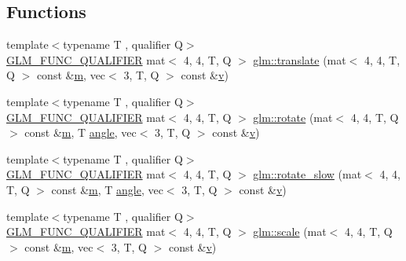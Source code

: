 \subsection*{Functions}
\begin{DoxyCompactItemize}
\item 
{\footnotesize template$<$typename T , qualifier Q$>$ }\\\mbox{\hyperlink{setup_8hpp_a33fdea6f91c5f834105f7415e2a64407}{G\+L\+M\+\_\+\+F\+U\+N\+C\+\_\+\+Q\+U\+A\+L\+I\+F\+I\+ER}} mat$<$ 4, 4, T, Q $>$ \mbox{\hyperlink{group__gtc__matrix__transform_ga1a4ecc4ad82652b8fb14dcb087879284}{glm\+::translate}} (mat$<$ 4, 4, T, Q $>$ const \&\mbox{\hyperlink{_s_d_l__opengl__glext_8h_af593500c283bf1a787a6f947f503a5c2}{m}}, vec$<$ 3, T, Q $>$ const \&\mbox{\hyperlink{_s_d_l__opengl_8h_a10a82eabcb59d2fcd74acee063775f90}{v}})
\item 
{\footnotesize template$<$typename T , qualifier Q$>$ }\\\mbox{\hyperlink{setup_8hpp_a33fdea6f91c5f834105f7415e2a64407}{G\+L\+M\+\_\+\+F\+U\+N\+C\+\_\+\+Q\+U\+A\+L\+I\+F\+I\+ER}} mat$<$ 4, 4, T, Q $>$ \mbox{\hyperlink{group__gtc__matrix__transform_gaee9e865eaa9776370996da2940873fd4}{glm\+::rotate}} (mat$<$ 4, 4, T, Q $>$ const \&\mbox{\hyperlink{_s_d_l__opengl__glext_8h_af593500c283bf1a787a6f947f503a5c2}{m}}, T \mbox{\hyperlink{_s_d_l__opengl__glext_8h_a9e06c1f76a20fed54ca742cd25cb02c4}{angle}}, vec$<$ 3, T, Q $>$ const \&\mbox{\hyperlink{_s_d_l__opengl_8h_a10a82eabcb59d2fcd74acee063775f90}{v}})
\item 
{\footnotesize template$<$typename T , qualifier Q$>$ }\\\mbox{\hyperlink{setup_8hpp_a33fdea6f91c5f834105f7415e2a64407}{G\+L\+M\+\_\+\+F\+U\+N\+C\+\_\+\+Q\+U\+A\+L\+I\+F\+I\+ER}} mat$<$ 4, 4, T, Q $>$ \mbox{\hyperlink{namespaceglm_ae6c0c49198a58536fac6ab580073b157}{glm\+::rotate\+\_\+slow}} (mat$<$ 4, 4, T, Q $>$ const \&\mbox{\hyperlink{_s_d_l__opengl__glext_8h_af593500c283bf1a787a6f947f503a5c2}{m}}, T \mbox{\hyperlink{_s_d_l__opengl__glext_8h_a9e06c1f76a20fed54ca742cd25cb02c4}{angle}}, vec$<$ 3, T, Q $>$ const \&\mbox{\hyperlink{_s_d_l__opengl_8h_a10a82eabcb59d2fcd74acee063775f90}{v}})
\item 
{\footnotesize template$<$typename T , qualifier Q$>$ }\\\mbox{\hyperlink{setup_8hpp_a33fdea6f91c5f834105f7415e2a64407}{G\+L\+M\+\_\+\+F\+U\+N\+C\+\_\+\+Q\+U\+A\+L\+I\+F\+I\+ER}} mat$<$ 4, 4, T, Q $>$ \mbox{\hyperlink{group__gtc__matrix__transform_ga05051adbee603fb3c5095d8cf5cc229b}{glm\+::scale}} (mat$<$ 4, 4, T, Q $>$ const \&\mbox{\hyperlink{_s_d_l__opengl__glext_8h_af593500c283bf1a787a6f947f503a5c2}{m}}, vec$<$ 3, T, Q $>$ const \&\mbox{\hyperlink{_s_d_l__opengl_8h_a10a82eabcb59d2fcd74acee063775f90}{v}})

\end{DoxyCompactItemize}
